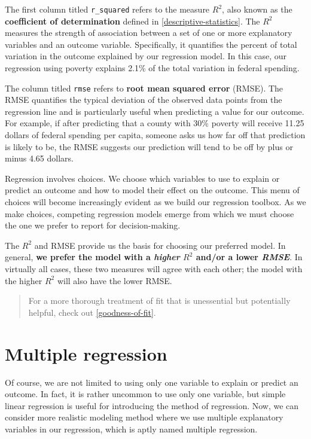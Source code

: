 \documentclass[
]{book}
\begin{document}
The first column titled \texttt{r\_squared} refers to the measure \(R^2\), also known as the \textbf{coefficient of determination} defined in \ref{descriptive-statistics}. The \(R^2\) measures the strength of association between a set of one or more explanatory variables and an outcome variable. Specifically, it quantifies the percent of total variation in the outcome explained by our regression model. In this case, our regression using poverty explains 2.1\% of the total variation in federal spending.

The column titled \texttt{rmse} refers to \textbf{root mean squared error} (RMSE). The RMSE quantifies the typical deviation of the observed data points from the regression line and is particularly useful when predicting a value for our outcome. For example, if after predicting that a county with 30\% poverty will receive 11.25 dollars of federal spending per capita, someone asks us how far off that prediction is likely to be, the RMSE suggests our prediction will tend to be off by plus or minus 4.65 dollars.

Regression involves choices. We choose which variables to use to explain or predict an outcome and how to model their effect on the outcome. This menu of choices will become increasingly evident as we build our regression toolbox. As we make choices, competing regression models emerge from which we must choose the one we prefer to report for decision-making.

The \(R^2\) and RMSE provide us the basis for choosing our preferred model. In general, \textbf{we prefer the model with a \emph{higher} \(R^2\) and/or a lower \emph{RMSE}}. In virtually all cases, these two measures will agree with each other; the model with the higher \(R^2\) will also have the lower RMSE.

\begin{quote}
For a more thorough treatment of fit that is unessential but potentially helpful, check out \ref{goodness-of-fit}.
\end{quote}

\hypertarget{multiple-regression}{%
\section{Multiple regression}\label{multiple-regression}}

Of course, we are not limited to using only one variable to explain or predict an outcome. In fact, it is rather uncommon to use only one variable, but simple linear regression is useful for introducing the method of regression. Now, we can consider more realistic modeling method where we use multiple explanatory variables in our regression, which is aptly named multiple regression.
\end{document}
